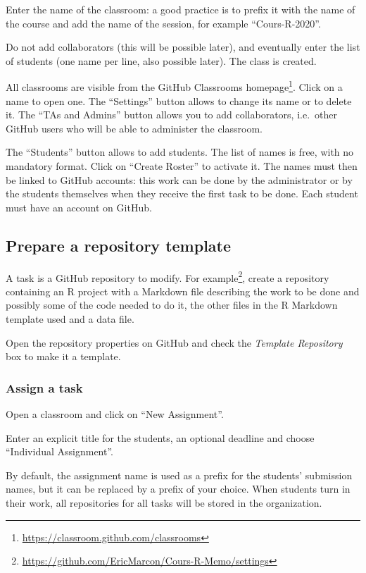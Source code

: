 \documentclass[
  12pt,
  american,
  a4paper,
  extrafontsizes,onecolumn,openright
  ]{memoir}
\begin{document}
Enter the name of the classroom: a good practice is to prefix it with the name of the course and add the name of the session, for example \enquote{Cours-R-2020}.

Do not add collaborators (this will be possible later), and eventually enter the list of students (one name per line, also possible later).
The class is created.

All classrooms are visible from the GitHub Classrooms homepage\footnote{\url{https://classroom.github.com/classrooms}}.
Click on a name to open one.
The \enquote{Settings} button allows to change its name or to delete it.
The \enquote{TAs and Admins} button allows you to add collaborators, i.e.~other GitHub users who will be able to administer the classroom.

The \enquote{Students} button allows to add students.
The list of names is free, with no mandatory format.
Click on \enquote{Create Roster} to activate it.
The names must then be linked to GitHub accounts: this work can be done by the administrator or by the students themselves when they receive the first task to be done.
Each student must have an account on GitHub.

\subsection{Prepare a repository template}\label{prepare-a-repository-template}

A task is a GitHub repository to modify.
For example\footnote{\url{https://github.com/EricMarcon/Cours-R-Memo/settings}}, create a repository containing an R project with a Markdown file describing the work to be done and possibly some of the code needed to do it, the other files in the R Markdown template used and a data file.

Open the repository properties on GitHub and check the \emph{Template Repository} box to make it a template.

\subsubsection{Assign a task}\label{assign-a-task}

Open a classroom and click on \enquote{New Assignment}.

Enter an explicit title for the students, an optional deadline and choose \enquote{Individual Assignment}.

By default, the assignment name is used as a prefix for the students' submission names, but it can be replaced by a prefix of your choice.
When students turn in their work, all repositories for all tasks will be stored in the organization.
\end{document}
